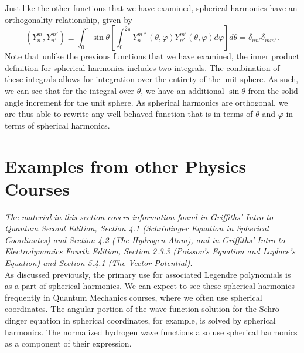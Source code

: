 \documentclass[11pt]{report}
\newcommand{\fpar}[1]{\left({#1}\right)}
\newcommand{\fbrac}[1]{\left[{#1}\right]}
\begin{document}
Just like the other functions that we have examined, spherical harmonics have an orthogonality relationship, given by
    \begin{equation}
        \fpar{Y_n^m,Y^{m'}_{n'}} \equiv \int_0^\pi\sin\theta\fbrac{\int_0^{2\pi}Y_n^{m*}\fpar{\theta,\varphi}Y_{n'}^{m'}\fpar{\theta,\varphi}d\varphi}d\theta = \delta_{nn'}\delta_{mm'}.
    \end{equation}
Note that unlike the previous functions that we have examined, the inner product definition for spherical harmonics includes two integrals. The combination of these integrals allows for integration over the entirety of the unit sphere. As such, we can see that for the integral over $\theta$, we have an additional $\sin\theta$ from the solid angle increment for the unit sphere. As spherical harmonics are orthogonal, we are thus able to rewrite any well behaved function that is in terms of $\theta$ and $\varphi$ in terms of spherical harmonics. 
 


\section{Examples from other Physics Courses}

\emph{The material in this section covers information found in Griffiths’ Intro to Quantum Second Edition, Section 4.1 (Schr$\text{\"{o}}$dinger Equation in Spherical Coordinates) and Section 4.2 (The Hydrogen Atom), and in Griffiths’ Intro to Electrodynamics Fourth Edition, Section 2.3.3 (Poisson’s Equation and Laplace’s Equation) and Section 5.4.1 (The Vector Potential).}\\

As discussed previously, the primary use for associated Legendre polynomials is as a part of spherical harmonics. We can expect to see these spherical harmonics frequently in Quantum Mechanics courses, where we often use spherical coordinates. The angular portion of the wave function solution for the Schr$\text{\"{o}}$dinger equation in spherical coordinates, for example, is solved by spherical harmonics. The normalized hydrogen wave functions also use spherical harmonics as a component of their expression.\\
\end{document}

